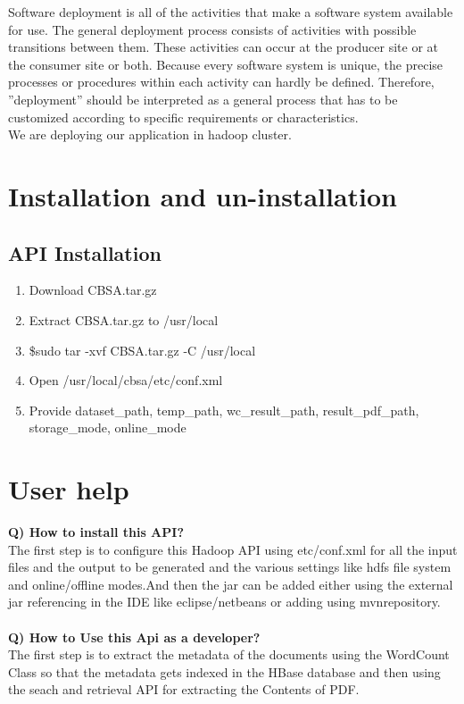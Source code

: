 \documentclass[oneside,a4paper,12pt]{report}
\begin{document}
{Software deployment is all of the activities that make a software system available for use. The general deployment process consists of activities with possible transitions between them. These activities can occur at the producer site or at the consumer site or both. Because every software system is unique, the precise processes or procedures within each activity can hardly be defined. Therefore, ”deployment” should be interpreted as a general process that has to be customized according to specific requirements or characteristics. \\
We are deploying our application in hadoop cluster.

\section{Installation and un-installation}
\subsection{API Installation}
	\begin{enumerate}
	\item Download CBSA.tar.gz 
	\item Extract CBSA.tar.gz to /usr/local
	\item \$sudo tar -xvf CBSA.tar.gz -C /usr/local
	\item Open /usr/local/cbsa/etc/conf.xml
	\item Provide dataset\_path,  temp\_path, wc\_result\_path,  result\_pdf\_path, storage\_mode, online\_mode
	\end{enumerate}
\section{User help}
\noindent\textbf{Q) How to install this API?}\\
The first step is to configure this Hadoop API using etc/conf.xml for all the input files and the output to be generated and the various settings like hdfs file system and online/offline modes.And then the jar can be added either using the external jar referencing in the IDE like eclipse/netbeans or adding using mvnrepository.\\\\

\noindent\textbf{Q) How to Use this Api as a developer?}\\
The first step is to extract the metadata of the documents using the WordCount Class so that the metadata gets indexed in the HBase database and then using the seach and retrieval API for extracting the Contents of PDF.\\\\

}
\end{document}
